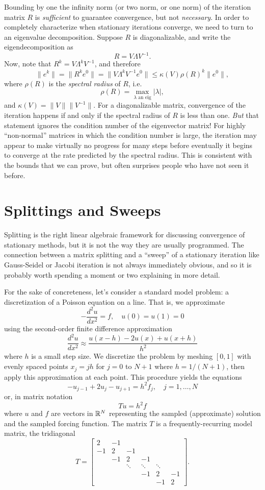\documentclass[12pt, leqno]{article}
\begin{document}
Bounding by one the infinity norm (or two norm, or one norm) of the
iteration matrix $R$ is {\em sufficient} to guarantee convergence,
but not {\em necessary}.  In order to completely characterize when
stationary iterations converge, we need to turn to an eigenvalue
decomposition.  Suppose $R$ is diagonalizable, and write the
eigendecomposition as
\[
  R = V \Lambda V^{-1}.
\]
Now, note that $R^k = V \Lambda^k V^{-1}$, and therefore
\[
  \|e^k\| = \|R^k e^0\| = \|V \Lambda^k V^{-1} e^0\| \leq \kappa(V)
  \rho(R)^k \|e^0\|,
\]
where $\rho(R)$ is the {\em spectral radius} of $R$, i.e.
\[
  \rho(R) = \max_{\lambda \mbox{ an eig}} |\lambda|,
\]
and $\kappa(V) = \|V\| \|V^{-1}\|$.  For a diagonalizable matrix,
convergence of the iteration happens if and only if the spectral
radius of $R$ is less than one.  {\em But} that statement ignores
the condition number of the eigenvector matrix!  For highly
``non-normal'' matrices in which the condition number is large,
the iteration may appear to make virtually no progress for many steps
before eventually it begins to converge at the rate predicted by
the spectral radius.  This is consistent with the bounds that we
can prove, but often surprises people who have not seen it before.

\section*{Splittings and Sweeps}

Splitting is the right linear algebraic framework for discussing
convergence of stationary methods, but it is not the way they are
usually programmed.  The connection between a matrix splitting and a
``sweep'' of a stationary iteration like Gauss-Seidel or Jacobi
iteration is not always immediately obvious, and so it is probably
worth spending a moment or two explaining in more detail.

For the sake of concreteness, let's consider a standard model problem:
a discretization of a Poisson equation on a line.  That is, we
approximate
\[
  -\frac{d^2 u}{dx^2} = f, \quad u(0) = u(1) = 0
\]
using the second-order finite difference approximation
\[
  \frac{d^2 u}{dx^2} \approx \frac{u(x-h)-2u(x)+u(x+h)}{h^2}
\]
where $h$ is a small step size.  We discretize the problem by meshing
$[0,1]$ with evenly spaced points $x_j = jh$ for $j = 0$
to $N+1$ where $h = 1/(N+1)$, then apply this approximation at each
point.  This procedure yields the equations
\[
  -u_{j-1}+2u_j-u_{j+1} = h^2 f_j, \quad j = 1, \ldots, N
\]
or, in matrix notation
\[
  Tu = h^2 f
\]
where $u$ and $f$ are vectors in $\mathbb{R}^N$ representing the sampled
(approximate) solution and the sampled forcing function.  The matrix
$T$ is a frequently-recurring model matrix, the tridiagonal
\[
T =
\begin{bmatrix}
   2 & -1 \\
  -1 &  2 & -1 \\
     & -1 &  2 & -1 \\
     &    & \ddots & \ddots & \ddots \\
     &    &        & -1 & 2 & -1 \\
     &    &        &    & -1 & 2
\end{bmatrix}.
\]
\end{document}
